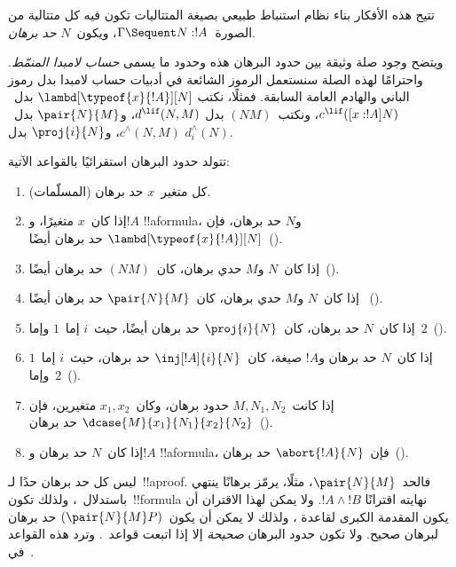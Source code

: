 \documentclass[../../../include/open-logic-section]{subfiles}
\begin{document}
تتيح هذه الأفكار بناء نظام استنباط طبيعي بصيغة المتتاليات تكون فيه كل
متتالية من الصورة~$\Gamma\Sequent N:!A$، ويكون~$N$ \emph{حد برهان}.

ويتضح وجود صلة وثيقة بين حدود البرهان هذه وحدود ما يسمى \emph{حساب لامبدا
المنمّط}. واحترامًا لهذه الصلة سنستعمل الرموز الشائعة في أدبيات حساب لامبدا
بدل رموز الباني والهادم العامة السابقة. فمثلًا، نكتب
$\lambd[\typeof{x}{!A}][N]$ بدل~$c^{\lif}([x:!A]N)$، ونكتب~$(NM)$ بدل
$d^{\lif}(N,M)$، و$\pair{N}{M}$ بدل~$c^\land(N,M)$، و$\proj{i}{N}$ بدل
$d^\land_i(N)$.

\begin{defn}
  تتولد حدود البرهان استقرائيًا بالقواعد الآتية:
  \begin{enumerate}
  \item كل متغير~$x$ حد برهان (المسلّمات).
  \item إذا كان~$x$ متغيرًا، و$!A$ !!a{formula}، و$N$ حد برهان، فإن
    $\lambd[\typeof{x}{!A}][N]$ حد برهان أيضًا~(\Intro\lif).
  \item إذا كان~$N$ و$M$ حدي برهان، كان~$(NM)$ حد برهان أيضًا~(\Elim\lif).
  \item إذا كان~$N$ و$M$ حدي برهان، كان~$\pair{N}{M}$ حد برهان أيضًا
    ~(\Intro\land).
  \item إذا كان~$N$ حد برهان، كان~$\proj{i}{N}$ حد برهان أيضًا، حيث~$i$
    إما~$1$ وإما~$2$~(\Elim\land[i]).
  \item إذا كان~$N$ حد برهان و$!A$ صيغة، كان~$\inj[!A]{i}{N}$ حد برهان،
    حيث~$i$ إما~$1$ وإما~$2$~(\Intro\lor[i]).
  \item إذا كانت~$M,N_1,N_2$ حدود برهان، وكان~$x_1,x_2$ متغيرين، فإن
    $\dcase{M}{x_1}{N_1}{x_2}{N_2}$ حد برهان~(\Elim\lor).
  \item إذا كان~$N$ حد برهان و$!A$ !!a{formula}، فإن~$\abort{!A}{N}$
    حد برهان~(\FalseInt).
  \end{enumerate}
\end{defn}

ليس كل حد برهان حدًا لـ~!!a{proof}. فالحد~$\pair{N}{M}$، مثلًا، يرمّز
برهانًا ينتهي باستدلال~\Intro{\land}، ولذلك تكون~!!{formula} نهايته اقترانًا
$!A\land !B$. ولا يمكن لهذا الاقتران أن يكون المقدمة الكبرى لقاعدة
\Elim{\lif}، ولذلك لا يمكن أن يكون~$(\pair{N}{M}P)$ حد برهان لبرهان صحيح.
ولا تكون حدود البرهان \emph{صحيحة} إلا إذا اتبعت قواعد~. وترد
هذه القواعد في~.


\end{document}
